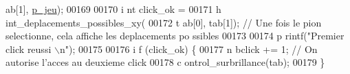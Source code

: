 \begin{DoxyCode}
      ab[1], \hyperlink{moteur_8h_a3efa8d0f7c65daedc584dc8db048e62c}{p_jeu});
00169 
00170                                                                                 \textcolor{keywordtype}{i
      nt} click\_ok =
00171                                                                                                 h
      int\_deplacements\_possibles\_xy(
00172                                                                                                                 t
      ab[0], tab[1]); \textcolor{comment}{// Une fois le pion selectionne, cela affiche les deplacements po
      ssibles}
00173 
00174                                                                                 p
      rintf(\textcolor{stringliteral}{"Premier click reussi \(\backslash\)n"});
00175 
00176                                                                                 \textcolor{keywordflow}{i
      f} (click\_ok) \{
00177                                                                                         n
      bclick += 1; \textcolor{comment}{// On autorise l'acces au deuxieme click}
00178                                                                                         c
      ontrol\_surbrillance(tab);
00179                                                                                 \}
      

\end{DoxyCode}
